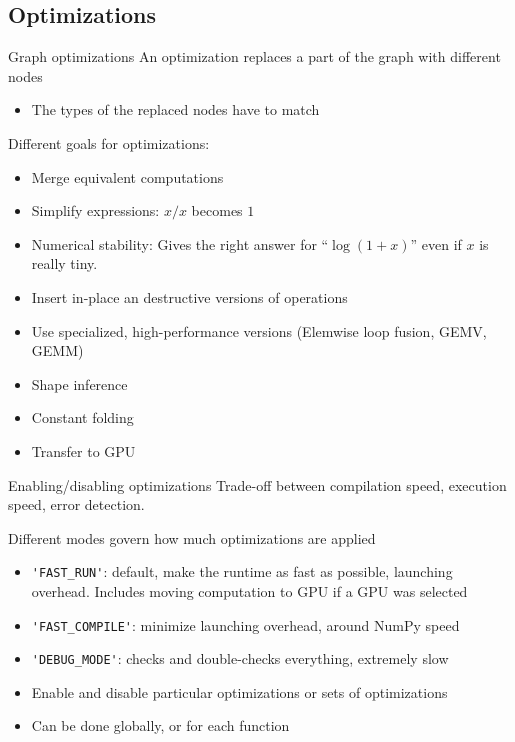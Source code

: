 \documentclass[a4paper,9pt]{beamer}
\begin{document}
\subsection{Optimizations}
\begin{frame}{Graph optimizations}
  An optimization replaces a part of the graph with different nodes
  \begin{itemize}
    \item The types of the replaced nodes have to match
  \end{itemize}
  Different goals for optimizations:
  \begin{itemize}
    \item Merge equivalent computations
    \item Simplify expressions: $x / x$ becomes $1$
    \item Numerical stability: Gives the right answer for ``$\log (1 + x)$'' even if $x$ is really tiny.
    \item Insert in-place an destructive versions of operations
    \item Use specialized, high-performance versions (Elemwise loop fusion, GEMV, GEMM)
    \item Shape inference
    \item Constant folding
    \item Transfer to GPU
  \end{itemize}
\end{frame}

\begin{frame}[fragile]{Enabling/disabling optimizations}
  Trade-off between compilation speed, execution speed, error detection.

  Different modes govern how much optimizations are applied
  \begin{itemize}
    \item \verb|'FAST_RUN'|: default, make the runtime as fast as possible, launching overhead.
      Includes moving computation to GPU if a GPU was selected
    \item \verb|'FAST_COMPILE'|: minimize launching overhead, around NumPy speed
    \item \verb|'DEBUG_MODE'|: checks and double-checks everything, extremely slow
    \item Enable and disable particular optimizations or sets of optimizations
    \item Can be done globally, or for each function
  \end{itemize}
\end{frame}
\end{document}
